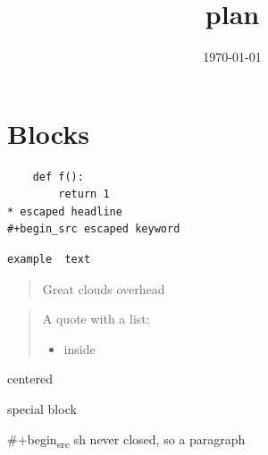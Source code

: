 \documentclass[11pt]{article}
\author{}
\date{\today}
\title{plan}
\begin{document}
\maketitle
\tableofcontents

\section{Blocks}
\label{org2f124dc1}

\begin{verbatim}
    def f():
        return 1
* escaped headline
#+begin_src escaped keyword
\end{verbatim}

\begin{verbatim}
example  text
\end{verbatim}

\begin{verse}
Great clouds overhead
\end{verse}

\begin{quote}
A quote with a list:

\begin{itemize}
\item inside
\end{itemize}
\end{quote}

\begin{center}
centered
\end{center}

\begin{note}
special block
\end{note}

\#+begin\textsubscript{src} sh
never closed, so a paragraph
\end{document}
